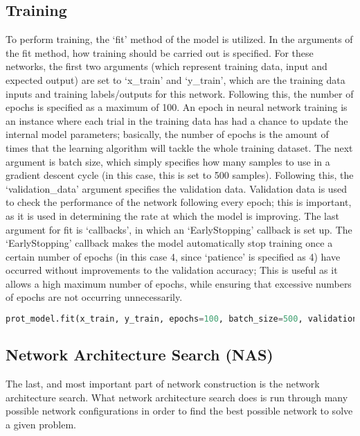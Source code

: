 \documentclass[12pt,letterpaper,oneside,reqno]{book}
\theoremstyle{plain}
\theoremstyle{definition}
\theoremstyle{plain}
\theoremstyle{remark}
\theoremstyle{plain}
\theoremstyle{definition}
\theoremstyle{plain}
\begin{document}
\subsection{Training}
To perform training, the `fit' method of the model is utilized. In the arguments of the fit method, how training should be carried out is specified. For these networks, the first two arguments (which represent training data, input and expected output) are set to `x\_train' and `y\_train', which are the training data inputs and training labels/outputs for this network. Following this, the number of epochs is specified as a maximum of 100. An epoch in neural network training is an instance where each trial in the training data has had a chance to update the internal model parameters; basically, the number of epochs is the amount of times that the learning algorithm will tackle the whole training dataset. The next argument is batch size, which simply specifies how many samples to use in a gradient descent cycle (in this case, this is set to 500 samples). Following this, the `validation\_data' argument specifies the validation data. Validation data is used to check the performance of the network following every epoch; this is important, as it is used in determining the rate at which the model is improving. The last argument for fit is `callbacks', in which an `EarlyStopping' callback is set up. The `EarlyStopping' callback makes the model automatically stop training once a certain number of epochs (in this case 4, since `patience' is specified as 4) have occurred without improvements to the validation accuracy; This is useful as it allows a high maximum number of epochs, while ensuring that excessive numbers of epochs are not occurring unnecessarily.
\begin{lstlisting}[language=Python, caption={Code to Perform Model Fitting}, label=lst:model_fit, frame=single]
prot_model.fit(x_train, y_train, epochs=100, batch_size=500, validation_data=(x_val, y_val), callbacks = [tf.keras.callbacks.EarlyStopping(patience = 4)])
\end{lstlisting}

\subsection{Network Architecture Search (NAS)}\label{NAS}
The last, and most important part of network construction is the network architecture search. What network architecture search does is run through many possible network configurations in order to find the best possible network to solve a given problem.
\end{document}
